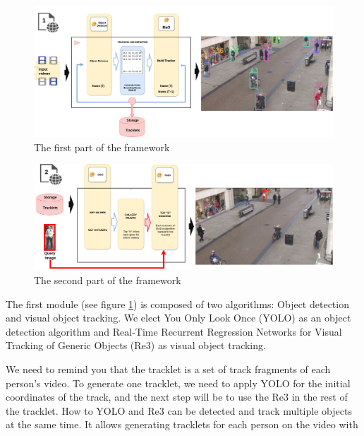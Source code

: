 \documentclass[a4paper]{article}
\begin{document}
\begin{figure}[ht]
    \centering
    \includegraphics[width=17cm]{imgs/new_model_tesis_2021_part1.png}
    \caption[test framework part 1]{The first part of the framework}
    \label{fig:framework_part1}
\end{figure}\leavevmode\newline

\begin{figure}[ht]
    \centering
    \includegraphics[width=17cm]{imgs/new_model_tesis_2021_part2.png}
    \caption[test framework part 2]{The second part of the framework}
    \label{fig:framework_part2}
\end{figure}\leavevmode\newline


The first module (see figure \ref{fig:framework_part1}) is composed of two algorithms: Object detection and visual object tracking.  We elect  You Only Look Once (YOLO) \cite{YOLO} as an object detection algorithm and Real-Time Recurrent Regression Networks for Visual Tracking of Generic Objects (Re3) \cite{re3} as visual object tracking. 

\leavevmode\newline
We need to remind you that the tracklet is a set of track fragments of each person's video. To generate one tracklet, we need to apply YOLO for the initial coordinates of the track, and the next step will be to use the Re3 in the rest of the tracklet. How to YOLO and Re3 can be detected and track multiple objects at the same time. It allows generating tracklets for each person on the video with 
\end{document}
